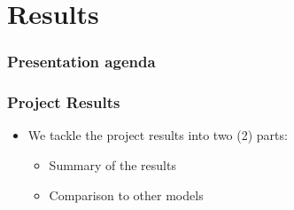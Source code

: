 \section{Results}
\begin{frame}
\frametitle{Presentation agenda}
\tableofcontents[currentsection]
\end{frame}

\begin{frame}
\frametitle{Project Results}
	\begin{itemize}
		\item We tackle the project results into two (2) parts:
			\begin{itemize}
				\item Summary of the results
				\item Comparison to other models
			\end{itemize}
	\end{itemize}
\end{frame}



